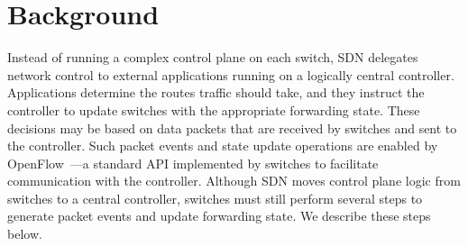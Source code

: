 \section{Background}
\label{sec-motivation}


Instead of running a complex control plane on each switch, SDN delegates
network control to external applications running on a logically central
controller. 
Applications determine the routes traffic should take, and they
instruct the controller to update switches with the appropriate forwarding
state. These decisions may be based on data packets that are
received by switches and sent to the controller. Such packet events and
state update operations are enabled by OpenFlow~\cite{openflow}---a standard
API implemented by switches to facilitate communication with the controller.
Although SDN moves control plane logic from switches to a central controller, 
switches must still perform several steps to generate packet events and update
forwarding state. We describe these steps below.


